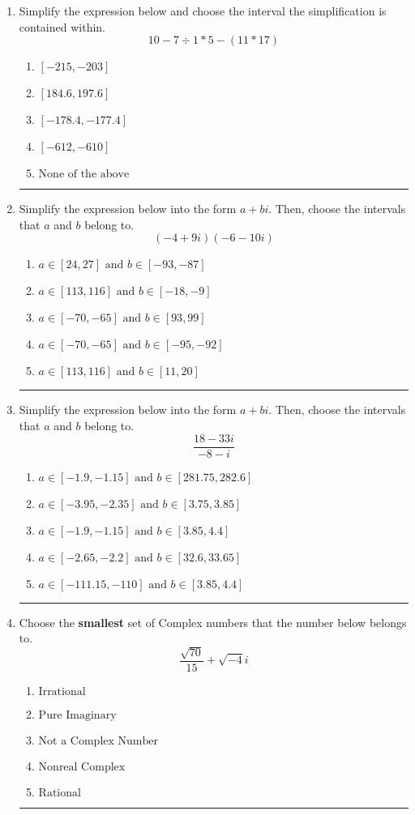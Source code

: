 \documentclass[14pt]{extbook}
\newcommand{\litem}[1]{\item#1\hspace*{-1cm}\rule{\textwidth}{0.4pt}}
\begin{document}
\begin{enumerate}
\litem{
Simplify the expression below and choose the interval the simplification is contained within.\[ 10 - 7 \div 1 * 5 - (11 * 17) \]\begin{enumerate}[label=\Alph*.]
\item \( [-215, -203] \)
\item \( [184.6, 197.6] \)
\item \( [-178.4, -177.4] \)
\item \( [-612, -610] \)
\item \( \text{None of the above} \)

\end{enumerate} }
\litem{
Simplify the expression below into the form $a+bi$. Then, choose the intervals that $a$ and $b$ belong to.\[ (-4 + 9 i)(-6 - 10 i) \]\begin{enumerate}[label=\Alph*.]
\item \( a \in [24, 27] \text{ and } b \in [-93, -87] \)
\item \( a \in [113, 116] \text{ and } b \in [-18, -9] \)
\item \( a \in [-70, -65] \text{ and } b \in [93, 99] \)
\item \( a \in [-70, -65] \text{ and } b \in [-95, -92] \)
\item \( a \in [113, 116] \text{ and } b \in [11, 20] \)

\end{enumerate} }
\litem{
Simplify the expression below into the form $a+bi$. Then, choose the intervals that $a$ and $b$ belong to.\[ \frac{18 - 33 i}{-8 - i} \]\begin{enumerate}[label=\Alph*.]
\item \( a \in [-1.9, -1.15] \text{ and } b \in [281.75, 282.6] \)
\item \( a \in [-3.95, -2.35] \text{ and } b \in [3.75, 3.85] \)
\item \( a \in [-1.9, -1.15] \text{ and } b \in [3.85, 4.4] \)
\item \( a \in [-2.65, -2.2] \text{ and } b \in [32.6, 33.65] \)
\item \( a \in [-111.15, -110] \text{ and } b \in [3.85, 4.4] \)

\end{enumerate} }
\litem{
Choose the \textbf{smallest} set of Complex numbers that the number below belongs to.\[ \frac{\sqrt{70}}{15}+\sqrt{-4}i \]\begin{enumerate}[label=\Alph*.]
\item \( \text{Irrational} \)
\item \( \text{Pure Imaginary} \)
\item \( \text{Not a Complex Number} \)
\item \( \text{Nonreal Complex} \)
\item \( \text{Rational} \)


\end{enumerate}}
\end{enumerate}
\end{document}
